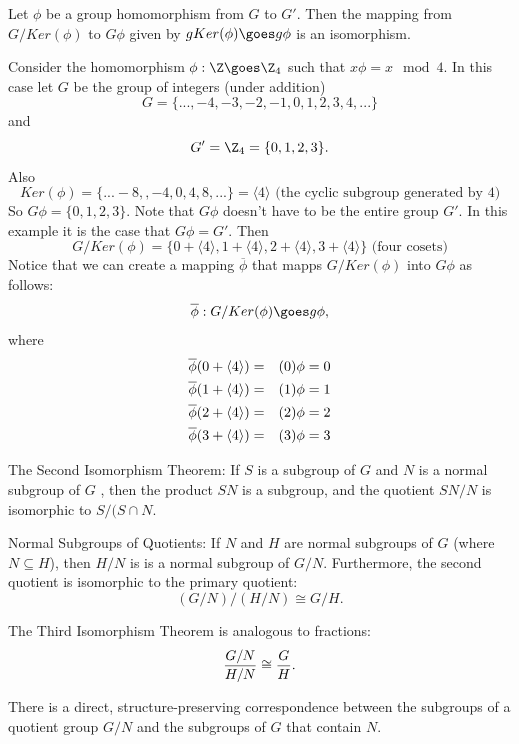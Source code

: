 \begin{theorem}  Let $\phi$ be a group homomorphism from $G$ to $G'$. Then the mapping from $G/Ker(\phi)$ to $G\phi$ given by 
$g Ker(\phi) \goes g\phi$ is an isomorphism.
\end{theorem}
\begin{example}Consider the homomorphism $\phi: \Z \goes \Z_4$ such that $x\phi = x\mod4$.
In this case let $G$ be the group of integers (under addition) \[ G = \{..., -4, -3, -2, -1, 0, 1, 2, 3, 4, ...\}\] 
and \[ G' = \Z_4 = \{ 0, 1, 2, 3\}. \]
Also \[ Ker(\phi) = \{ ...-8, ,-4, 0, 4, 8, ...\} = \langle4\rangle \mbox{   (the cyclic subgroup generated by 4)} \] 
So $G\phi = \{ 0, 1, 2, 3\}$. Note that $G\phi$ doesn't have to be the entire group $G'$. In this example it is the case that $G\phi = G'$.
Then \[ G/ Ker(\phi) = \{ 0 + \langle4\rangle, 1 + \langle4\rangle, 2 + \langle4\rangle, 3+\langle4\rangle \} \mbox{   (four cosets)}\]
Notice that we can create a mapping $\overline{\phi}$ that mapps $G/Ker(\phi)$ into $G\phi$ as follows: 
\[ \overline{\phi}: G/Ker(\phi) \goes g\phi, \] where
\begin{eqnarray*}
\overline{\phi}(0+\langle4\rangle) &=& (0)\phi = 0\cr
\overline{\phi}(1+\langle4\rangle) &=& (1)\phi = 1\cr
\overline{\phi}(2+\langle4\rangle) &=& (2)\phi = 2\cr
\overline{\phi}(3+\langle4\rangle) &=& (3)\phi = 3
\end{eqnarray*}
\end{example}

\begin{theorem}  The Second Isomorphism Theorem: If  $S$
 is a subgroup of $G$  and $N$  is a normal subgroup of $G$ , then the product $SN$ is a subgroup, and the quotient 
$SN / N$  is isomorphic to  $S / (S \cap N$.\end{theorem}

\begin{theorem} Normal Subgroups of Quotients: If $N$ and $H$ are normal subgroups of $G$ (where $N \subseteq H$), then 
$H/N$ is  is a normal subgroup of $G/N$. Furthermore, the second quotient is 
isomorphic to the primary quotient: \[ (G / N )/  (H / N)  \cong G / H. \]
\end{theorem}
The Third Isomorphism Theorem is analogous to fractions:
\[ {G / N \over H / N} \cong {G\over H}.\]

\begin{theorem} 
There is a direct, structure-preserving correspondence between the subgroups of a quotient group $G / N$
 and the subgroups of $G$
 that contain $N$.
\end{theorem}

